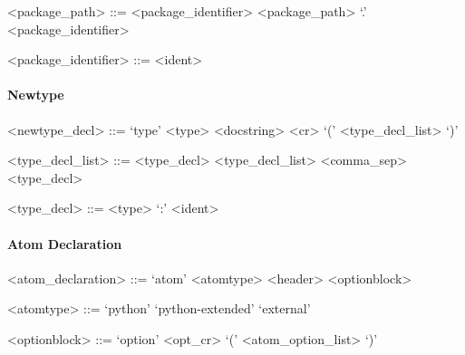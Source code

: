 \vs

\begin{grammar}
  <package_path> ::= <package_identifier>
  \alt <package_path> `.' <package_identifier>
\end{grammar}

\vs

\begin{grammar}
  <package_identifier> ::= <ident>
\end{grammar}


\paragraph{Newtype}

\begin{grammar}
  <newtype_decl> ::= `type' <type> <docstring> <cr> `('
  <type_decl_list> `)'
\end{grammar}

\vs

\begin{grammar}
  <type_decl_list> ::= <type_decl>
  \alt <type_decl_list> <comma_sep> <type_decl>
\end{grammar}

\vs

\begin{grammar}
  <type_decl> ::= <type> `:' <ident>
\end{grammar}


\paragraph{Atom Declaration}

\begin{grammar}
  <atom_declaration> ::= `atom' <atomtype> <header> <optionblock>
\end{grammar}

\vs

\begin{grammar}
  <atomtype> ::= `python'
  \alt `python-extended'
  \alt `external'
\end{grammar}

\vs

\begin{grammar}
  <optionblock> ::= `option' <opt_cr> `(' <atom_option_list> `)'
\end{grammar}


